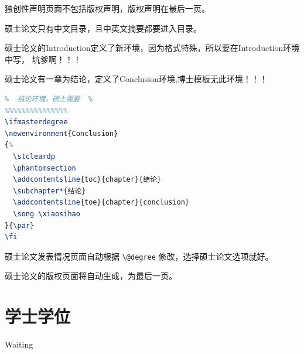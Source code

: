独创性声明页面不包括版权声明，版权声明在最后一页。

硕士论文只有中文目录，且中英文摘要都要进入目录。

硕士论文的Introduction定义了新环境，因为格式特殊，所以要在Introduction环境中写，
坑爹啊！！！

硕士论文有一章为结论，定义了Conclusion环境,博士模板无此环境！！！
\begin{lstlisting}[language=TeX]
%%%%%%%%%%%%%%%
%  结论环境，硕士需要  %
%%%%%%%%%%%%%%%
\ifmasterdegree
\newenvironment{Conclusion}
{%
  \stcleardp
  \phantomsection
  \addcontentsline{toc}{chapter}{结论}
  \subchapter*{结论}
  \addcontentsline{toe}{chapter}{conclusion}
  \song \xiaosihao
}{\par}
\fi
\end{lstlisting}

硕士论文发表情况页面自动根据 \lstinline|\@degree| 修改，选择硕士论文选项就好。

硕士论文的版权页面将自动生成，为最后一页。
\section{学士学位}
Waiting
